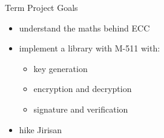\documentclass{beamer}
\begin{document}
%	
%
%		
%

\begin{frame}{Term Project Goals}
\begin{itemize}
	\pause
	\item understand the maths behind ECC
	\pause
	\item implement a library with M-511 with:
\begin{itemize}
	\item key generation
	\item encryption and decryption
	\item signature and verification
\end{itemize}
	\pause
	\item hike Jirisan
\end{itemize}
\end{frame} 
\end{document}
